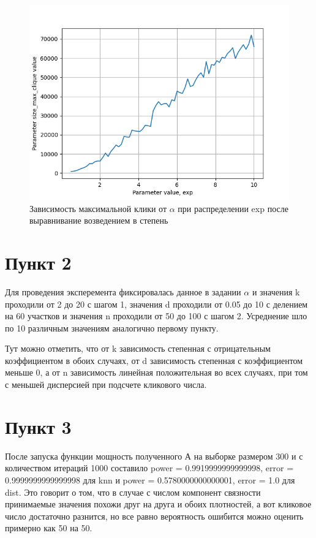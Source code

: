 \documentclass{HSEtitle}
\begin{document}
\begin{figure}
    \centering
    \includegraphics[width=0.65\linewidth]{exp_alpha_fix.png}
    \caption{Зависимость максимальной клики от $\alpha$ при распределении exp после выравнивание возведением в степень}
    \label{fig:enter-label}
\end{figure}

\pagebreak

\section{Пункт 2}

Для проведения эксперемента фиксировалась данное в задании $\alpha$ и значения k проходили от 2 до 20 с шагом 1, значения d проходили от 0.05 до 10 с делением на 60 участков и значения n проходили от 50 до 100 с шагом 2. Усреднение шло по 10 различным значениям аналогично первому пункту.

Тут можно отметить, что от k зависимость степенная с отрицательным коэффициентом в обоих случаях, от d зависимость степенная с коэффициентом меньше 0, а от n зависимость линейная положительная во всех случаях, при том с меньшей дисперсией при подсчете кликового числа.

\section{Пункт 3}

После запуска функции мощность полученного А на выборке размером 300 и с количеством итераций 1000 составило power =  0.9919999999999998, error =  0.9999999999999998 для knn и power = 0.5780000000000001, error =  1.0 для dist. Это говорит о том, что в случае с числом компонент связности принимаемые значения похожи друг на друга и обоих плотностей, а вот кликовое число достаточно разнится, но все равно вероятность ошибится можно оценить примерно как 50 на 50.
\end{document}
